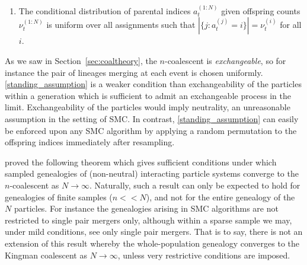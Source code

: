 \begin{enumerate}[label=(A\arabic*)]
\item\label{standing_assumption} The conditional distribution of parental indices $a_t^{(1:N)}$ given offspring counts $\nu_t^{(1:N)}$ is uniform over all assignments such that $ |\{ j: a_t^{(j)} =i \}|= \nu_t^{(i)} $ for all $i$.
\end{enumerate}
As we saw in Section~\ref{sec:coaltheory}, the $n$-coalescent is \emph{exchangeable}, so for instance the pair of lineages merging at each event is chosen uniformly. 
\ref{standing_assumption} is a weaker condition than exchangeability of the particles within a generation which is sufficient to admit an exchangeable process in the limit.
Exchangeability of the particles would imply neutrality, an unreasonable assumption in the setting of SMC. 
In contrast, \ref{standing_assumption} can easily be enforced upon any SMC algorithm by applying a random permutation to the offspring indices immediately after resampling.


\textcite{koskela2018} proved the following theorem which gives sufficient conditions under which sampled genealogies of (non-neutral) interacting particle systems converge to the $n$-coalescent as $N\to\infty$.
Naturally, such a result can only be expected to hold for genealogies of finite samples ($n<<N$), and not for the entire genealogy of the $N$ particles. 
For instance the genealogies arising in SMC algorithms are not restricted to single pair mergers only, although within a sparse sample we may, under mild conditions, see only single pair mergers. 
That is to say, there is not an extension of this result whereby the whole-population genealogy converges to the Kingman coalescent as $N\to\infty$, unless very restrictive conditions are imposed.

